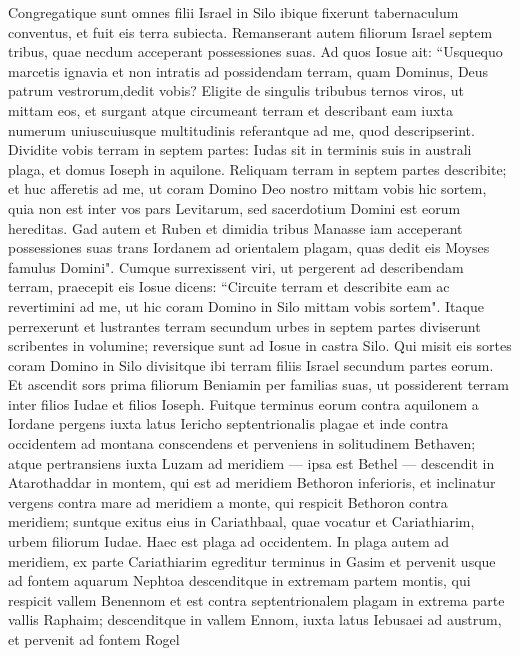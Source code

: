 \begin{biblechapter}  
\verse Congregatique sunt omnes filii Israel in Silo ibique fixerunt tabernaculum conventus, et fuit eis terra subiecta. 
\verse Remanserant autem filiorum Israel septem tribus, quae necdum acceperant possessiones suas. 
\verse Ad quos Iosue ait: “Usquequo marcetis ignavia et non intratis ad possidendam terram, quam Dominus, Deus patrum vestrorum,dedit vobis? 
\verse Eligite de singulis tribubus ternos viros, ut mittam eos, et surgant atque circumeant terram et describant eam iuxta numerum uniuscuiusque multitudinis referantque ad me, quod descripserint. 
\verse Dividite vobis terram in septem partes: Iudas sit in terminis suis in australi plaga, et domus Ioseph in aquilone. 
\verse Reliquam terram in septem partes describite; et huc afferetis ad me, ut coram Domino Deo nostro mittam vobis hic sortem, 
\verse quia non est inter vos pars Levitarum, sed sacerdotium Domini est eorum hereditas. Gad autem et Ruben et dimidia tribus Manasse iam acceperant possessiones suas trans Iordanem ad orientalem plagam, quas dedit eis Moyses famulus Domini". 
\verse Cumque surrexissent viri, ut pergerent ad describendam terram, praecepit eis Iosue dicens: “Circuite terram et describite eam ac revertimini ad me, ut hic coram Domino in Silo mittam vobis sortem". 
\verse Itaque perrexerunt et lustrantes terram secundum urbes in septem partes diviserunt scribentes in volumine; reversique sunt ad Iosue in castra Silo. 
\verse Qui misit eis sortes coram Domino in Silo divisitque ibi terram filiis Israel secundum partes eorum. 
\verse Et ascendit sors prima filiorum Beniamin per familias suas, ut possiderent terram inter filios Iudae et filios Ioseph. 
\verse Fuitque terminus eorum contra aquilonem a Iordane pergens iuxta latus Iericho septentrionalis plagae et inde contra occidentem ad montana conscendens et perveniens in solitudinem Bethaven; 
\verse atque pertransiens iuxta Luzam ad meridiem — ipsa est Bethel — descendit in Atarothaddar in montem, qui est ad meridiem Bethoron inferioris, 
\verse et inclinatur vergens contra mare ad meridiem a monte, qui respicit Bethoron contra meridiem; suntque exitus eius in Cariathbaal, quae vocatur et Cariathiarim, urbem filiorum Iudae. Haec est plaga ad occidentem. 
\verse In plaga autem ad meridiem, ex parte Cariathiarim egreditur terminus in Gasim et pervenit usque ad fontem aquarum Nephtoa 
\verse descenditque in extremam partem montis, qui respicit vallem Benennom et est contra septentrionalem plagam in extrema parte vallis Raphaim; descenditque in vallem Ennom, iuxta latus Iebusaei ad austrum, et pervenit ad fontem Rogel 

\end{biblechapter}
